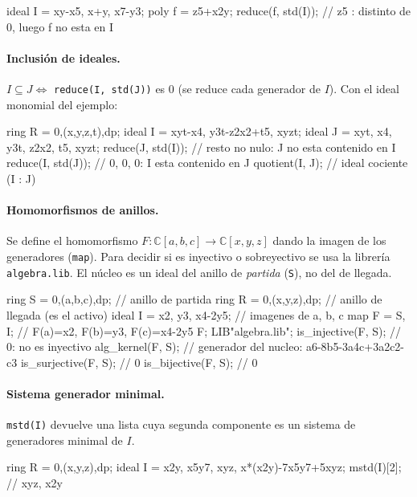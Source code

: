 \documentclass[11pt,a4paper]{article}
\begin{document}
\begin{singular}
ideal I  = xy-x5, x+y, x7-y3;
poly f = z5+x2y;
reduce(f, std(I));          // z5 : distinto de 0, luego f no esta en I
\end{singular}

\paragraph{Inclusión de ideales.} $I \subseteq J \iff$ \texttt{reduce(I, std(J))} es $0$ (se reduce cada generador de $I$). Con el ideal monomial del ejemplo:

\begin{singular}
ring R = 0,(x,y,z,t),dp;
ideal I = xyt-x4, y3t-z2x2+t5, xyzt;
ideal J = xyt, x4, y3t, z2x2, t5, xyzt;
reduce(J, std(I));          // resto no nulo: J no esta contenido en I
reduce(I, std(J));          // 0, 0, 0: I esta contenido en J
quotient(I, J);             // ideal cociente (I : J)
\end{singular}

\paragraph{Homomorfismos de anillos.} Se define el homomorfismo $F\colon \mathbb{C}[a,b,c] \to \mathbb{C}[x,y,z]$ dando la imagen de los generadores (\texttt{map}). Para decidir si es inyectivo o sobreyectivo se usa la librería \texttt{algebra.lib}. El núcleo es un ideal del anillo de \emph{partida} (\texttt{S}), no del de llegada.

\begin{singular}
ring S = 0,(a,b,c),dp;      // anillo de partida
ring R = 0,(x,y,z),dp;      // anillo de llegada (es el activo)
ideal I = x2, y3, x4-2y5;   // imagenes de a, b, c
map F = S, I;               // F(a)=x2, F(b)=y3, F(c)=x4-2y5
F;
LIB"algebra.lib";
is_injective(F, S);         // 0: no es inyectivo
alg_kernel(F, S);           // generador del nucleo: a6-8b5-3a4c+3a2c2-c3
is_surjective(F, S);        // 0
is_bijective(F, S);         // 0
\end{singular}

\paragraph{Sistema generador minimal.} \texttt{mstd(I)} devuelve una lista cuya segunda componente es un sistema de generadores minimal de $I$.

\begin{singular}
ring R = 0,(x,y,z),dp;
ideal I = x2y, x5y7, xyz, x*(x2y)-7x5y7+5xyz;
mstd(I)[2];                 // xyz, x2y
\end{singular}
\end{document}
